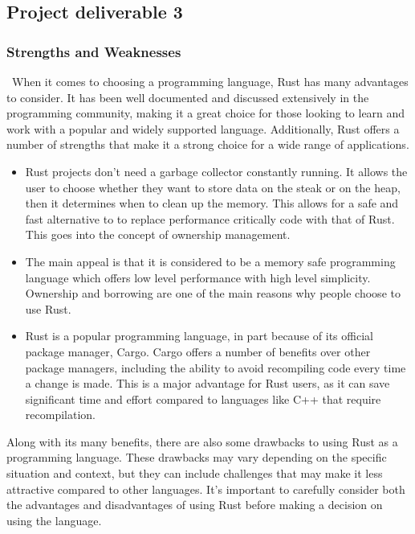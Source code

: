 \documentclass{article}
\theoremstyle{theorem}
\theoremstyle{definition}
\theoremstyle{remark}
\begin{document}
\subsection{Project deliverable 3 }
\subsubsection{Strengths and Weaknesses}\
When it comes to choosing a programming language, Rust has many advantages to consider. It has been well documented and discussed extensively in the programming community, making it a great choice for those looking to learn and work with a popular and widely supported language. Additionally, Rust offers a number of strengths that make it a strong choice for a wide range of applications.
\begin{itemize}
\item Rust projects don’t need a garbage collector constantly running. It allows the user to choose whether they want to store data on the steak or on the heap, then it determines when to clean up the memory. This allows for a safe and fast alternative to to replace performance critically code with that of Rust. This goes into the concept of ownership management.
\item The main appeal is that it is considered to be a memory safe programming language which offers low level performance with high level simplicity. Ownership and borrowing are one of the main reasons why people choose to use Rust.
\item Rust is a popular programming language, in part because of its official package manager, Cargo. Cargo offers a number of benefits over other package managers, including the ability to avoid recompiling code every time a change is made. This is a major advantage for Rust users, as it can save significant time and effort compared to languages like C++ that require recompilation. 
\end{itemize}
Along with its many benefits, there are also some drawbacks to using Rust as a programming language. These drawbacks may vary depending on the specific situation and context, but they can include challenges that may make it less attractive compared to other languages. It's important to carefully consider both the advantages and disadvantages of using Rust before making a decision on using the language.
\end{document}
